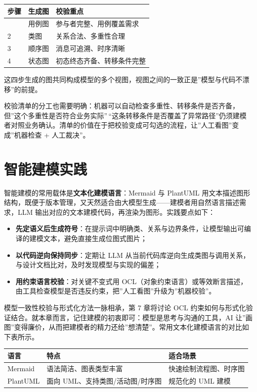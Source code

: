 \documentclass[12pt,a4paper,twoside,openany]{ctexbook}
\numberwithin{figure}{chapter}
\numberwithin{table}{chapter}
\providecommand{\tightlist}{\setlength{\itemsep}{0pt}\setlength{\parskip}{0pt}}
\newcounter{none}
\begin{document}
{\def\LTcaptype{none} %
\begin{longtable}[]{@{}lll@{}}
\toprule\noalign{}
步骤 & 生成图 & 校验重点 \\
\midrule\noalign{}
\endhead
\bottomrule\noalign{}
\endlastfoot
1 & 用例图 & 参与者完整、用例覆盖需求 \\
2 & 类图 & 关系合法、多重性合理 \\
3 & 顺序图 & 消息可追溯、时序清晰 \\
4 & 状态图 & 初态终态齐备、转移条件完整 \\
\end{longtable}
}

这四步生成的图共同构成模型的多个视图，视图之间的一致正是''模型与代码不漂移''的前提。

校验清单的分工也需要明确：机器可以自动检查多重性、转移条件是否齐备，但''这个多重性是否符合业务实际''\,``这条转移条件是否覆盖了异常路径''仍须建模者对照业务确认。清单的价值在于把校验变成可勾选的流程，让''人工看图''变成''机器检查
+ 人工裁决''。

\section{智能建模实践}\label{ux667aux80fdux5efaux6a21ux5b9eux8df5}

智能建模的常用载体是\textbf{文本化建模语言}：Mermaid 与 PlantUML
用文本描述图形结构，既便于版本管理，又天然适合由大模型生成------建模者用自然语言描述需求，LLM
输出对应的文本建模代码，再渲染为图形。实践要点如下：

\begin{itemize}
\tightlist
\item
  \textbf{先定语义后生成符号}：在提示词中明确类、关系与边界条件，让模型输出可编译的建模文本，避免直接生成位图式图片；
\item
  \textbf{以代码逆向保持同步}：定期让 LLM
  从当前代码库逆向生成类图与调用关系，与设计文档比对，及时发现模型与实现的偏差；
\item
  \textbf{用约束语言校验}：对关键不变式用
  OCL（对象约束语言）或等效断言描述，由工具检查模型是否违反约束，把''人工看图''升级为''机器校验''。
\end{itemize}

模型一致性校验与形式化方法一脉相承，第 7 章将讨论 OCL
约束如何与形式化验证结合。就本章而言，记住建模的初衷即可：模型是思考与沟通的工具，AI
让''画图''变得廉价，从而把建模者的精力还给''想清楚''。常用文本化建模语言的对比如下表所示。

{\def\LTcaptype{none} %
\begin{longtable}[]{@{}lll@{}}
\toprule\noalign{}
语言 & 特点 & 适合场景 \\
\midrule\noalign{}
\endhead
\bottomrule\noalign{}
\endlastfoot
Mermaid & 语法简洁、图表类型丰富 & 快速绘制流程图、时序图 \\
PlantUML & 面向 UML、支持类图/活动图/时序图 & 规范化的 UML 建模 \\
\end{longtable}
}
\end{document}
